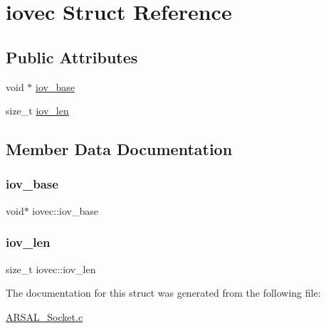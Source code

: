 \hypertarget{structiovec}{}\section{iovec Struct Reference}
\label{structiovec}
\subsection*{Public Attributes}
\begin{DoxyCompactItemize}
\item 
void $\ast$ \hyperlink{structiovec_a07aeddeccf80f14520fdd7ef0759442b}{iov\+\_\+base}
\item 
size\+\_\+t \hyperlink{structiovec_a17b5ac2078fd1adfabb262a95808a07d}{iov\+\_\+len}
\end{DoxyCompactItemize}


\subsection{Member Data Documentation}
\hypertarget{structiovec_a07aeddeccf80f14520fdd7ef0759442b}{}\label{structiovec_a07aeddeccf80f14520fdd7ef0759442b} 
\subsubsection{\texorpdfstring{iov\+\_\+base}{iov\_base}}
{\footnotesize\ttfamily void$\ast$ iovec\+::iov\+\_\+base}

\hypertarget{structiovec_a17b5ac2078fd1adfabb262a95808a07d}{}\label{structiovec_a17b5ac2078fd1adfabb262a95808a07d} 
\subsubsection{\texorpdfstring{iov\+\_\+len}{iov\_len}}
{\footnotesize\ttfamily size\+\_\+t iovec\+::iov\+\_\+len}



The documentation for this struct was generated from the following file\+:\begin{DoxyCompactItemize}
\item 
\hyperlink{ARSAL__Socket_8c}{A\+R\+S\+A\+L\+\_\+\+Socket.\+c}\end{DoxyCompactItemize}
